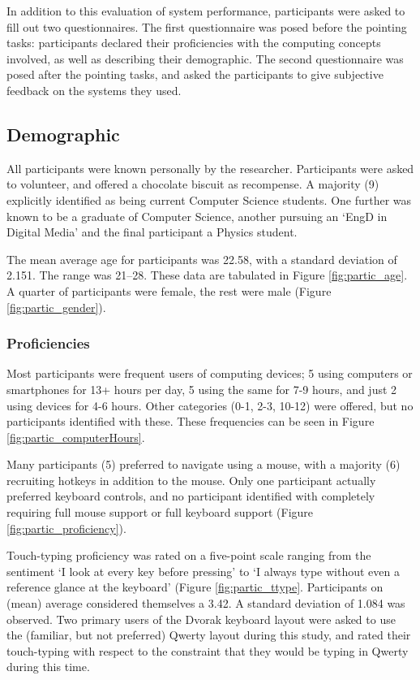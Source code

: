 \documentclass[a4paper, 12pt]{report}
\begin{document}
In addition to this evaluation of system performance, participants were asked to fill out two questionnaires. The first questionnaire was posed before the pointing tasks: participants declared their proficiencies with the computing concepts involved, as well as describing their demographic. The second questionnaire was posed after the pointing tasks, and asked the participants to give subjective feedback on the systems they used.

\subsection{Demographic}
All participants were known personally by the researcher. Participants were asked to volunteer, and offered a chocolate biscuit as recompense. A majority (9) explicitly identified as being current Computer Science students. One further was known to be a graduate of Computer Science, another pursuing an `EngD in Digital Media' and the final participant a Physics student.

The mean average age for participants was 22.58, with a standard deviation of 2.151. The range was 21--28. These data are tabulated in Figure \ref{fig:partic_age}.
A quarter of participants were female, the rest were male (Figure \ref{fig:partic_gender}).

\subsubsection{Proficiencies}
Most participants were frequent users of computing devices; 5 using computers or smartphones for 13+ hours per day, 5 using the same for 7-9 hours, and just 2 using devices for 4-6 hours. Other categories (0-1, 2-3, 10-12) were offered, but no participants identified with these. These frequencies can be seen in Figure \ref{fig:partic_computerHours}.

Many participants (5) preferred to navigate using a mouse, with a majority (6) recruiting hotkeys in addition to the mouse. Only one participant actually preferred keyboard controls, and no participant identified with completely requiring full mouse support or full keyboard support (Figure \ref{fig:partic_proficiency}).

Touch-typing proficiency was rated on a five-point scale ranging from the sentiment `I look at every key before pressing' to `I always type without even a reference glance at the keyboard' (Figure \ref{fig:partic_ttype}. Participants on (mean) average considered themselves a 3.42. A standard deviation of 1.084 was observed. Two primary users of the Dvorak keyboard layout were asked to use the (familiar, but not preferred) Qwerty layout during this study, and rated their touch-typing with respect to the constraint that they would be typing in Qwerty during this time.
\end{document}
